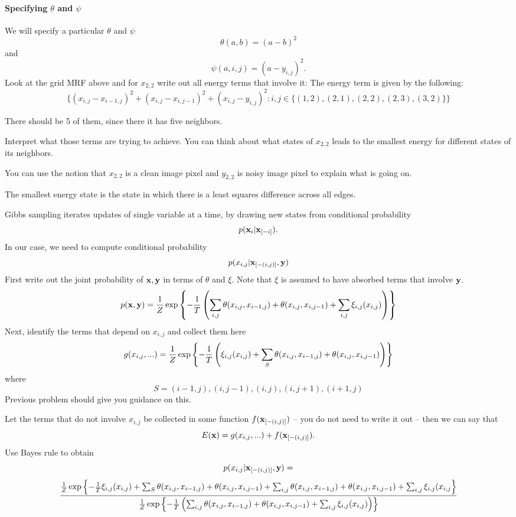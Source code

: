 \documentclass{article}
\begin{document}
\paragraph{Specifying $\theta$ and $\psi$}
We will specify a particular $\theta$ and $\psi$
\[
\theta(a,b) = (a - b)^2
\]
and
\[
\psi(a,i,j) = (a - y_{i,j})^2.
\]
Look at the grid MRF above and for $x_{2,2}$ write out all energy terms that involve it:
The energy term is given by the following:
\[
\{(x_{i,j} - x_{i-1,j})^2 + (x_{i,j} - x_{i,j-1})^2 + (x_{i,j} - y_{i,j})^2 : i,j \in \{(1,2),(2,1),(2,2),(2,3),(3,2)\}\}
\]

There should be 5 of them, since there it has five neighbors.

Interpret what those terms are trying to achieve. You can think about what states
 of $x_{2,2}$ leads to the smallest energy for different states of its neighbors.

You can use the notion that $x_{2,2}$ is a clean image pixel and $y_{2,2}$ is noisy image
 pixel to explain what is going on.

The smallest energy state is the state in which there is a least squares difference across all edges.

\newproblem{2pt}
Gibbs sampling iterates updates of single variable at a time, by drawing new
states from conditional probability
\[
p(\mathbf{x}_{i} | \mathbf{x}_{[-i]}).
\]
In our case, we need to compute conditional probability
\[
p(x_{i,j} | \mathbf{x}_{[-(i,j)]},\mathbf{y})
\]
First write out the joint probability of $\mathbf{x},\mathbf{y}$ in terms of $\theta$ and $\xi$. Note that $\xi$ is
assumed to have absorbed terms that involve $\mathbf{y}$.
\[
p(\mathbf{x},\mathbf{y}) = \frac{1}{Z}\mathop{\rm exp}\left\{-\frac{1}{T}\left(\sum_{i,j} \theta(x_{i,j},x_{i-1,j}) + \theta(x_{i,j},x_{i,j-1}) + \sum_{i,j} \xi_{i,j}(x_{i,j})\right)\right\}
\]
Next, identify the terms that depend on $x_{i,j}$ and collect them here
\[
g(x_{i,j},...) = \frac{1}{Z}\mathop{\rm exp}\left\{-\frac{1}{T}\left(\xi_{i,j}(x_{i,j}) + \sum_{S} \theta(x_{i,j},x_{i-1,j}) + \theta(x_{i,j},x_{i,j-1})\right)\right\}
\]
where
\[
S = {(i-1,j),(i,j-1),(i,j),(i,j+1),(i+1,j)}
\]
Previous problem should give you guidance on this.

Let the terms that do not involve $x_{i,j}$ be collected in some function $f(\mathbf{x}_{[-(i,j)]})$ -- you do not need to write it out -- then
we can say that
\[
E(\mathbf{x}) = g(x_{i,j},...) + f(\mathbf{x}_{[-(i,j)]}).
\]
Use Bayes rule to obtain
\[
p(x_{i,j}| \mathbf{x}_{[-(i,j)]},\mathbf{y}) = 
\]
\[
\frac{\frac{1}{Z}\mathop{\rm exp}\left\{-\frac{1}{T}\xi_{i,j}(x_{i,j}) + \sum_{S} \theta(x_{i,j},x_{i-1,j}) + \theta(x_{i,j},x_{i,j-1}) + \sum_{i,j} \theta(x_{i,j},x_{i-1,j}) + \theta(x_{i,j},x_{i,j-1}) + \sum_{i,j} \xi_{i,j}(x_{i,j}\right\}}{\frac{1}{Z}\mathop{\rm exp}\left\{-\frac{1}{T}\left(\sum_{i,j} \theta(x_{i,j},x_{i-1,j}) + \theta(x_{i,j},x_{i,j-1}) + \sum_{i,j} \xi_{i,j}(x_{i,j})\right)\right\}}
\]
\end{document}
